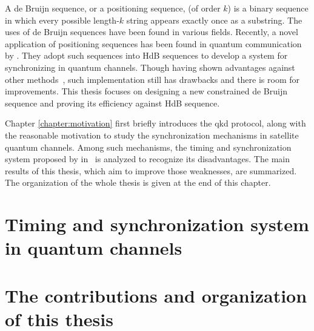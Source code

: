 A de Bruijn sequence, or a positioning sequence, (of order $k$) is a binary sequence in which every possible length-$k$ string appears exactly once as a substring. The uses of de Bruijn sequences have been found in various fields. Recently, a novel application of positioning sequences has been found in quantum communication by \citeauthor{zhang2021timing}. They adopt such sequences into \gls{HdB} sequences to develop a system for synchronizing in quantum channels. Though having shown advantages against other methods~\cite{zhang2021timing}, such implementation still has drawbacks and there is room for improvements. This thesis focuses on designing a new constrained de Bruijn sequence and proving its efficiency against \gls{HdB} sequence. 

Chapter \ref{chapter:motivation} first briefly introduces the \gls{qkd} protocol, along with the reasonable motivation to study the synchronization mechanisms in satellite quantum channels. Among such mechanisms, the timing and synchronization system proposed by \citeauthor{zhang2021timing} in~\cite{zhang2021timing} is analyzed to recognize its disadvantages. The main results of this thesis, which aim to improve those weaknesses, are summarized. The organization of the whole thesis is given at the end of this chapter. 


\section{Timing and synchronization system in quantum channels}


\section{The contributions and organization of this thesis}




